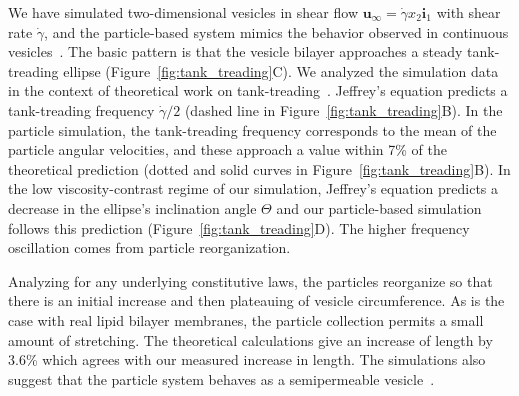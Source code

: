 We have simulated two-dimensional vesicles in shear flow
$\mathbf{u}_{\infty} = \dot{\gamma} x_2 \mathbf{i}_1$ with shear rate
$\dot{\gamma}$,
and the particle-based system mimics the behavior observed in continuous
vesicles~\cite{torres-sanchez_millan_arroyo_2019,
mahapatra_saintillan_rangamani_2020, Steigmann99, C6SM02452A}. The basic
pattern is that the vesicle bilayer approaches a steady tank-treading
ellipse (Figure~\ref{fig:tank_treading}C). We analyzed the simulation
data in the context of theoretical work on
tank-treading~\cite{Finken2008}. Jeffrey's equation predicts a
tank-treading frequency $\dot{\gamma}/2$ (dashed line in
Figure~\ref{fig:tank_treading}B). In the particle simulation, the
tank-treading frequency corresponds to the mean of the particle angular
velocities, and these approach a value within 7\% of the theoretical
prediction (dotted and solid curves in Figure~\ref{fig:tank_treading}B).
In the low viscosity-contrast regime of our simulation, Jeffrey's
equation predicts a decrease in the ellipse's inclination angle $\Theta$
and our particle-based simulation follows this prediction
(Figure~\ref{fig:tank_treading}D). The higher frequency oscillation
comes from particle reorganization.

Analyzing for any underlying constitutive laws, the particles reorganize
so that there is an initial increase and then plateauing of vesicle
circumference. As is the case with real lipid bilayer membranes, the
particle collection permits a small amount of stretching. The
theoretical calculations give an increase of length by 3.6\% which
agrees with our measured increase in length. The simulations also
suggest that the particle system behaves as a semipermeable
vesicle~\cite{323e9a2f0c58487ea82518d7a1f96485, YAO2017728}.

